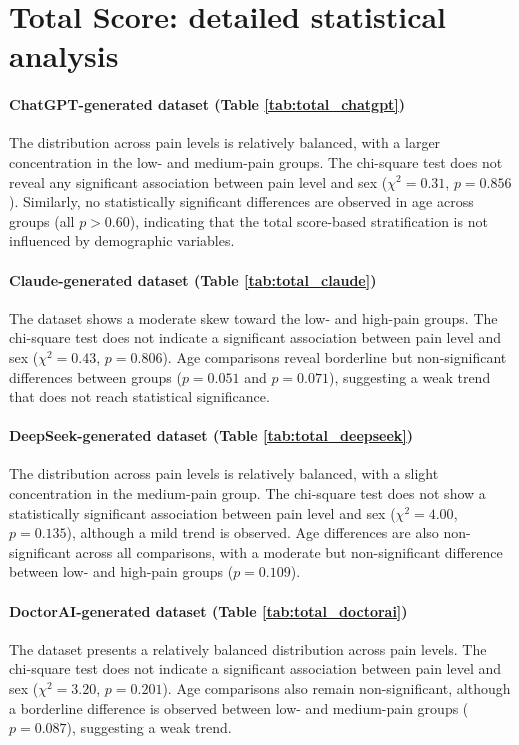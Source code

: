\documentclass[preprint,12pt,authoryear]{elsarticle}
\begin{document}
\section{Total Score: detailed statistical analysis}
\label{app:total_scoring_stats}

\paragraph{ChatGPT-generated dataset (Table \ref{tab:total_chatgpt})}
The distribution across pain levels is relatively balanced, with a larger concentration in the low- and medium-pain groups. The chi-square test does not reveal any significant association between pain level and sex ($\chi^2 = 0.31$, $p = 0.856$). Similarly, no statistically significant differences are observed in age across groups (all $p > 0.60$), indicating that the total score-based stratification is not influenced by demographic variables.

\paragraph{Claude-generated dataset (Table \ref{tab:total_claude})}
The dataset shows a moderate skew toward the low- and high-pain groups. The chi-square test does not indicate a significant association between pain level and sex ($\chi^2 = 0.43$, $p = 0.806$). Age comparisons reveal borderline but non-significant differences between groups ($p = 0.051$ and $p = 0.071$), suggesting a weak trend that does not reach statistical significance.

\paragraph{DeepSeek-generated dataset (Table \ref{tab:total_deepseek})}
The distribution across pain levels is relatively balanced, with a slight concentration in the medium-pain group. The chi-square test does not show a statistically significant association between pain level and sex ($\chi^2 = 4.00$, $p = 0.135$), although a mild trend is observed. Age differences are also non-significant across all comparisons, with a moderate but non-significant difference between low- and high-pain groups ($p = 0.109$).

\paragraph{DoctorAI-generated dataset (Table \ref{tab:total_doctorai})}
The dataset presents a relatively balanced distribution across pain levels. The chi-square test does not indicate a significant association between pain level and sex ($\chi^2 = 3.20$, $p = 0.201$). Age comparisons also remain non-significant, although a borderline difference is observed between low- and medium-pain groups ($p = 0.087$), suggesting a weak trend.
\end{document}
